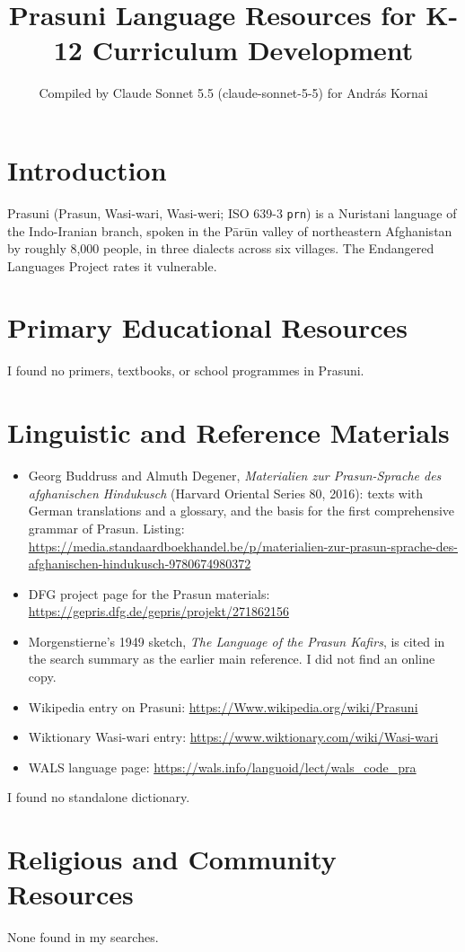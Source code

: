 \documentclass[12pt]{article}
\title{Prasuni Language Resources for K-12 Curriculum Development}
\author{Compiled by Claude Sonnet 5.5 (claude-sonnet-5-5) for Andr\'as Kornai}
\date{}
\begin{document}
\maketitle

\section{Introduction}
Prasuni (Prasun, Wasi-wari, Wasi-weri; ISO 639-3 \texttt{prn}) is a Nuristani language of the Indo-Iranian branch, spoken in the P\=ar\=un valley of northeastern Afghanistan by roughly 8,000 people, in three dialects across six villages. The Endangered Languages Project rates it vulnerable.

\section{Primary Educational Resources}
I found no primers, textbooks, or school programmes in Prasuni.

\section{Linguistic and Reference Materials}
\begin{itemize}
\item Georg Buddruss and Almuth Degener, \emph{Materialien zur Prasun-Sprache des afghanischen Hindukusch} (Harvard Oriental Series 80, 2016): texts with German translations and a glossary, and the basis for the first comprehensive grammar of Prasun. Listing: \url{https://media.standaardboekhandel.be/p/materialien-zur-prasun-sprache-des-afghanischen-hindukusch-9780674980372}
\item DFG project page for the Prasun materials: \url{https://gepris.dfg.de/gepris/projekt/271862156}
\item Morgenstierne's 1949 sketch, \emph{The Language of the Prasun Kafirs}, is cited in the search summary as the earlier main reference. I did not find an online copy.
\item Wikipedia entry on Prasuni: \url{https://Www.wikipedia.org/wiki/Prasuni}
\item Wiktionary Wasi-wari entry: \url{https://www.wiktionary.com/wiki/Wasi-wari}
\item WALS language page: \url{https://wals.info/languoid/lect/wals_code_pra}
\end{itemize}
I found no standalone dictionary.

\section{Religious and Community Resources}
None found in my searches.
\end{document}
